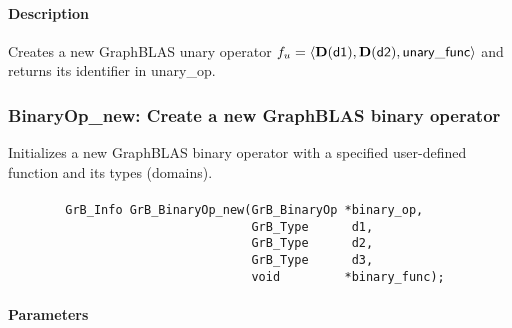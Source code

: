 \paragraph{Description}

Creates a new GraphBLAS unary operator $f_u = \langle \bold{D}({\sf d1}), 
\bold{D}({\sf d2}), {\sf unary\_func} \rangle$ and returns its identifier 
in {\sf unary\_op}.



\subsubsection{{\sf BinaryOp\_new}: Create a new GraphBLAS binary operator}

Initializes a new GraphBLAS binary operator with a specified user-defined 
function and its types (domains).

\paragraph{\syntax}

\begin{verbatim}
        GrB_Info GrB_BinaryOp_new(GrB_BinaryOp *binary_op,
                                  GrB_Type      d1,
                                  GrB_Type      d2,
                                  GrB_Type      d3,
                                  void         *binary_func);
\end{verbatim}

\paragraph{Parameters}

